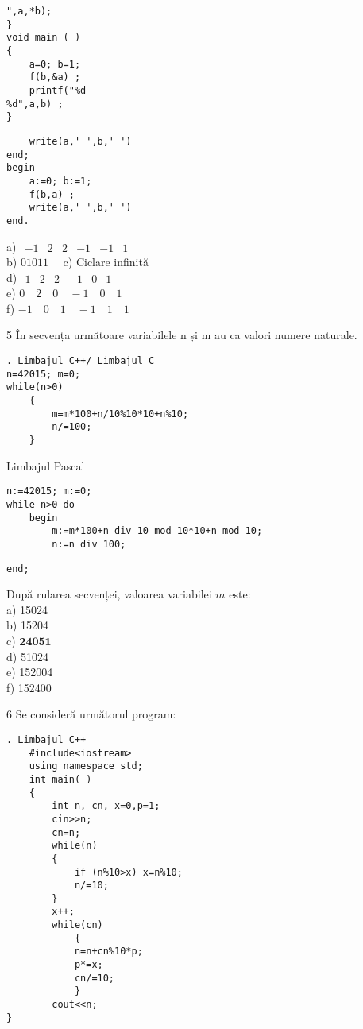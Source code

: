 \begin{verbatim}
",a,*b);
}
void main ( )
{
    a=0; b=1;
    f(b,&a) ;
    printf("%d
%d",a,b) ;
}
\end{verbatim}

\begin{verbatim}
    write(a,' ',b,' ')
end;
begin
    a:=0; b:=1;
    f(b,a) ;
    write(a,' ',b,' ')
end.
\end{verbatim}

a) $\begin{array}{llllll}-1 & 2 & 2 & -1 & -1 & 1\end{array}$\\
b) $01011 \quad$ c) Ciclare infinită\\
d) $\begin{array}{llllll}1 & 2 & 2 & -1 & 0 & 1\end{array}$\\
e) $0 \quad 2 \quad 0 \quad-1 \quad 0 \quad 1$\\
f) $-1 \quad 0 \quad 1 \quad-1 \quad 1 \quad 1$

5 În secvența următoare variabilele n și m au ca valori numere naturale.

\begin{verbatim}
. Limbajul C++/ Limbajul C
n=42015; m=0;
while(n>0)
    {
        m=m*100+n/10%10*10+n%10;
        n/=100;
    }
\end{verbatim}

Limbajul Pascal

\begin{verbatim}
n:=42015; m:=0;
while n>0 do
    begin
        m:=m*100+n div 10 mod 10*10+n mod 10;
        n:=n div 100;
\end{verbatim}

\begin{verbatim}
end;
\end{verbatim}

După rularea secvenței, valoarea variabilei $m$ este:\\
a) 15024\\
b) 15204\\
c) $\mathbf{2 4 0 5 1}$\\
d) 51024\\
e) 152004\\
f) 152400

6 Se consideră următorul program:

\begin{verbatim}
. Limbajul C++
    #include<iostream>
    using namespace std;
    int main( )
    {
        int n, cn, x=0,p=1;
        cin>>n;
        cn=n;
        while(n)
        {
            if (n%10>x) x=n%10;
            n/=10;
        }
        x++;
        while(cn)
            {
            n=n+cn%10*p;
            p*=x;
            cn/=10;
            }
        cout<<n;
}
\end{verbatim}

